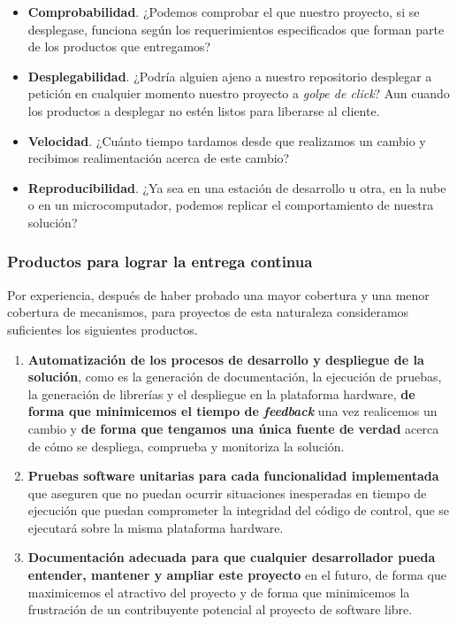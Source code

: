 \begin{itemize}[noitemsep,nolistsep]
    \item \textbf{Comprobabilidad}. ¿Podemos comprobar el que nuestro proyecto, si se desplegase,
          funciona según
          los requerimientos especificados que forman parte de los productos que
          entregamos?
    \item \textbf{Desplegabilidad}. ¿Podría alguien ajeno a nuestro repositorio desplegar a
          petición en cualquier momento nuestro proyecto a \textit{golpe de click}?
          Aun cuando los productos a desplegar no estén listos para liberarse al cliente.
    \item \textbf{Velocidad}. ¿Cuánto tiempo tardamos desde que realizamos un cambio y recibimos
          realimentación acerca de este cambio?
    \item \textbf{Reproducibilidad}. ¿Ya sea en una estación de desarrollo u otra, en la nube
          o en un microcomputador, podemos replicar el comportamiento de nuestra solución?
\end{itemize}

\subsubsection{Productos para lograr la entrega continua}

Por experiencia, después de haber probado una mayor cobertura y una
menor cobertura de mecanismos, para proyectos de esta naturaleza
consideramos suficientes los siguientes productos.

\begin{enumerate}
    \item \textbf{Automatización de los procesos de desarrollo y despliegue de la solución}, como es
    la generación de documentación, la ejecución de pruebas, la generación de librerías
    y el despliegue en la plataforma hardware, \textbf{de forma que minimicemos el tiempo de \textit{feedback}}
    una vez realicemos un cambio y \textbf{de forma que tengamos una única fuente de verdad} acerca de cómo
    se despliega, comprueba y monitoriza la solución.
    \item \textbf{Pruebas software unitarias para cada funcionalidad implementada} que aseguren que no
    puedan ocurrir situaciones inesperadas en tiempo
    de ejecución que puedan comprometer la integridad del código de control, que se ejecutará sobre
    la misma plataforma hardware.
    \item \textbf{Documentación adecuada para que cualquier desarrollador pueda entender,
    mantener y ampliar este proyecto} en el futuro, de forma que maximicemos el atractivo
    del proyecto y de forma que minimicemos la frustración de un contribuyente potencial
    al proyecto de software libre.
\end{enumerate}

